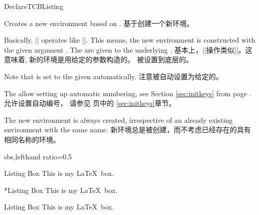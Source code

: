 \begin{docCommand}{DeclareTCBListing}{}
  
\begin{stripedbox}
Creates a new environment  based on .
\tcblower
基于创建一个新环境。
\end{stripedbox}


\begin{stripedbox}
Basically, |\DeclareTCBListing| operates like |\DeclareDocumentEnvironment|. This means,
the new environment  is constructed with the given argument .
The  are given to the underlying .
\tcblower
基本上，|\DeclareTCBListing|操作类似|\DeclareDocumentEnvironment|。这意味着,
新的环境是用给定的参数构造的。
被设置到底层的。
\end{stripedbox}


\begin{stripedbox}
Note that  is set to the given 
automatically.
\tcblower
注意被自动设置为给定的。
\end{stripedbox}

\begin{stripedbox}
The  allow setting up automatic numbering,
see Section \ref{sec:initkeys} from page \pageref{sec:initkeys}.
\tcblower
{}允许设置自动编号，%
请参见 \pageref{sec:initkeys} 页中的 \ref{sec:initkeys}章节。
\end{stripedbox}

\begin{stripedbox}
The new environment is always created, irrespective of an already existing
environment with the same name.
\tcblower
新环境总是被创建，而不考虑已经存在的具有相同名称的环境。
\end{stripedbox}

\begin{dispExample*}{sbs,lefthand ratio=0.5}

\begin{mybox}{Listing Box}
This is my
\LaTeX\ box.
\end{mybox}
\bigskip

\begin{mybox}*{Listing Box}
This is my
\LaTeX\ box.
\end{mybox}
\bigskip

\begin{mybox}[colback=yellow]
  {Listing Box}
This is my
\LaTeX\ box.
\end{mybox}
\end{dispExample*}
\end{docCommand}


